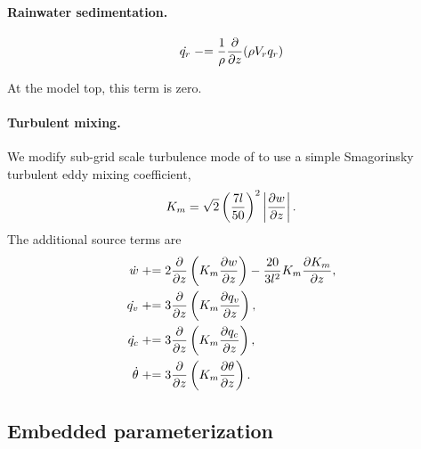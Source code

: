 \paragraph{Rainwater sedimentation.} 

\begin{equation}
  \dot{q_r} \mathrel{-}= \frac{1}{\rho}\frac{\partial  }{\partial z}(\rho V_rq_r)
\end{equation}

At the model top, this term is zero.


\paragraph{Turbulent mixing.}

We modify sub-grid scale turbulence mode of \cite{KlempWilhelmson1978} to use a simple Smagorinsky turbulent eddy mixing coefficient,
\begin{equation}
  K_m = \sqrt{2}\left(\frac{7l}{50}\right)^2 \left\lvert\frac{\partial w }{\partial z}\right\rvert.
\end{equation}
The additional source terms are \cite[eqns.~(3.15)--(3.16)]{KlempWilhelmson1978}
\begin{align}
  \dot{w} &\mathrel{+}= 2 \frac{\partial  }{\partial z}\left(K_m \frac{\partial w }{\partial z}\right) - \frac{20}{3 l^2}K_m\frac{\partial K_m }{\partial z},\\
  \dot{q_v} &\mathrel{+}= 3\frac{\partial  }{\partial z}\left(K_m\frac{\partial q_v }{\partial z}\right), \\
  \dot{q_c} &\mathrel{+}= 3\frac{\partial  }{\partial z}\left(K_m\frac{\partial q_c }{\partial z}\right), \\
  \dot{\theta} &\mathrel{+}= 3\frac{\partial  }{\partial z}\left(K_m\frac{\partial \theta }{\partial z}\right). 
\end{align}
\subsection{Embedded parameterization}
